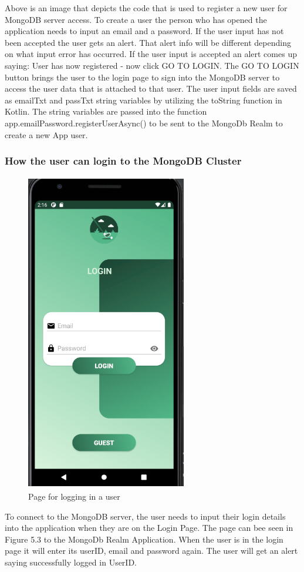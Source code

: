 Above is an image that depicts the code that is used to register a new user for MongoDB server access. To create a user the person who has opened the application needs to input an email and a password. If the user input has not been accepted the user gets an alert. That alert info will be different depending on what input error has occurred. If the user input is accepted an alert comes up saying: User has now registered - now click GO TO LOGIN. The GO TO LOGIN button brings the user to the login page to sign into the MongoDB server to access the user data that is attached to that user.
\newline
The user input fields are saved as emailTxt and passTxt string variables by utilizing the toString function in Kotlin. The string variables are passed into the function app.emailPassword.registerUserAsync() to be sent to the MongoDb Realm to create a new App user.


\subsubsection{How the user can login to the MongoDB Cluster}
\begin{figure}[H]
    \centering
    \includegraphics[width=7cm, height = 14cm]{img/loginPage.PNG}
    \caption{Page for logging in a user}
    \label{fig:altas config}
\end{figure}
To connect to the MongoDB server, the user needs to input their login details into the application when they are on the Login Page. The page can bee seen in Figure 5.3 to the MongoDb Realm Application. When the user is in the login page it will enter its userID, email and password again. The user will get an alert saying successfully logged in UserID.

